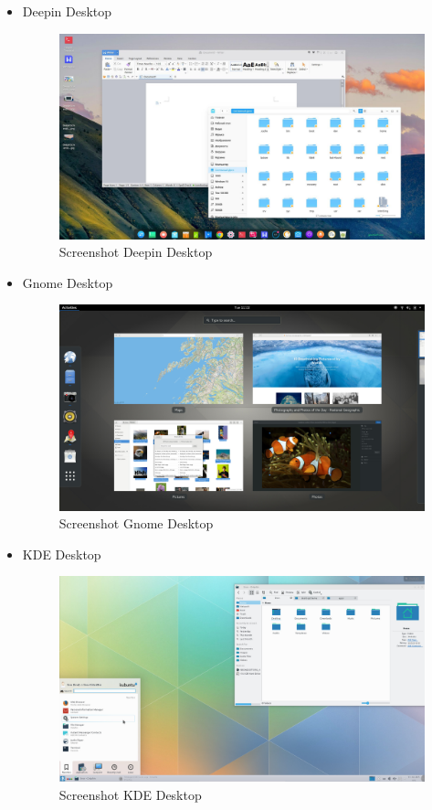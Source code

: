 \documentclass[12pt,]{article}
\begin{document}
\begin{itemize}
		\newpage
		\item Deepin Desktop
		\begin{figure}[H]
			\centering
			\includegraphics[width=0.8\linewidth]{images/vbox_de/deepin}
			\caption{Screenshot Deepin Desktop}
		\end{figure}
	
		\item Gnome Desktop
		\begin{figure}[H]
			\centering
			\includegraphics[width=0.8\linewidth]{images/vbox_de/gnome}
			\caption{Screenshot Gnome Desktop}
		\end{figure}
	
		\item KDE Desktop
		\begin{figure}[H]
			\centering
			\includegraphics[width=0.8\linewidth]{images/vbox_de/kde4}
			\caption{Screenshot KDE Desktop}
		\end{figure}
	

\end{itemize}
\end{document}
